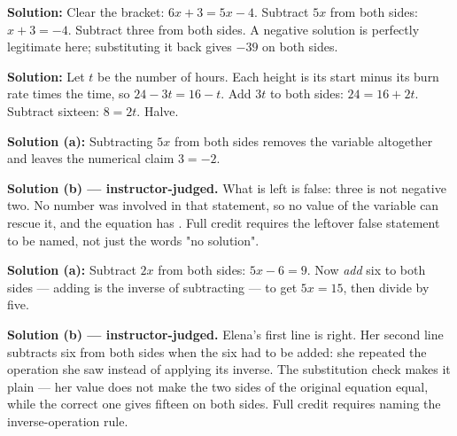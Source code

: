 \documentclass[12pt]{article}
\begin{document}

\textbf{Solution:} \quad Clear the bracket: $6x + 3 = 5x - 4$. Subtract $5x$ from both
sides: $x + 3 = -4$. Subtract three from both sides. A negative solution is perfectly
legitimate here; substituting it back gives $-39$ on both sides. 


\textbf{Solution:} \quad Let $t$ be the number of hours. Each height is its start minus its
burn rate times the time, so $24 - 3t = 16 - t$. Add $3t$ to both sides:
$24 = 16 + 2t$. Subtract sixteen: $8 = 2t$. Halve. 


\textbf{Solution (a):} \quad Subtracting $5x$ from both sides removes the variable
altogether and leaves the numerical claim $3 = -2$. 

\textbf{Solution (b) --- instructor-judged.} \quad What is left is false: three is not
negative two. No number was involved in that statement, so no value of the variable can
rescue it, and the equation has . Full credit requires the leftover
false statement to be named, not just the words "no solution".


\textbf{Solution (a):} \quad Subtract $2x$ from both sides: $5x - 6 = 9$. Now \emph{add}
six to both sides --- adding is the inverse of subtracting --- to get $5x = 15$, then
divide by five. 

\textbf{Solution (b) --- instructor-judged.} \quad Elena's first line is right. Her second
line subtracts six from both sides when the six had to be added: she repeated the operation
she saw instead of applying its inverse. The substitution check makes it plain --- her value
does not make the two sides of the original equation equal, while the correct one gives
fifteen on both sides. Full credit requires naming the inverse-operation rule.
\end{document}
